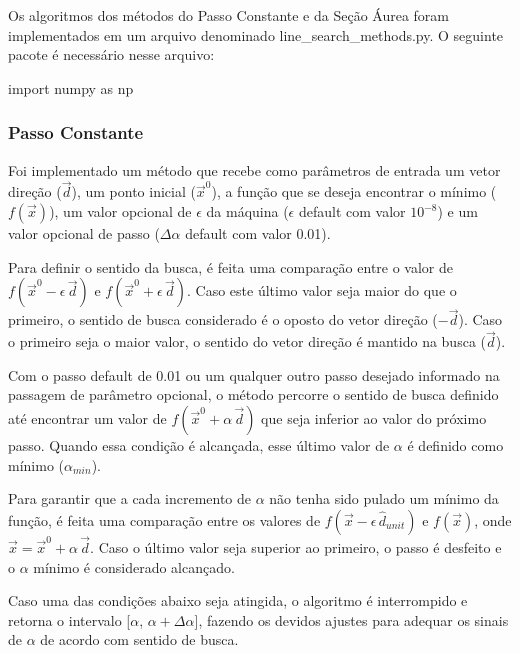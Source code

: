 \documentclass[10pt, a4paper]{article}
\begin{document}
Os algoritmos dos métodos do Passo Constante e da Seção Áurea foram implementados em um arquivo denominado line\_search\_methods.py.
O seguinte pacote é necessário nesse arquivo: 
\begin{python}
  import numpy as np
\end{python}

\subsubsection{Passo Constante}


Foi implementado um método que recebe como parâmetros de entrada um vetor direção ($\overrightarrow{d}$),
um ponto inicial ($\overrightarrow{x}^0$), 
a função que se deseja encontrar o mínimo ($f(\overrightarrow{x})$),
um valor opcional de $\epsilon$ da máquina ($\epsilon$ default com valor $10^{-8}$) e
um valor opcional de passo ($\Delta\alpha$ default com valor 0.01).

Para definir o sentido da busca, é feita uma comparação entre o valor de $f(\overrightarrow{x}^0-\epsilon\,\overrightarrow{d})$ e $f(\overrightarrow{x}^0+\epsilon\,\overrightarrow{d})$.
Caso este último valor seja maior do que o primeiro, o sentido de busca considerado é o oposto do vetor direção ($-\overrightarrow{d}$). Caso o primeiro seja
o maior valor, o sentido do vetor direção é mantido na busca ($\overrightarrow{d}$).

Com o passo default de 0.01 ou um qualquer outro passo desejado informado na passagem de parâmetro opcional,
o método percorre o sentido de busca definido até encontrar um valor de
$f(\overrightarrow{x}^0+ \alpha\,\overrightarrow{d})$ que seja inferior ao valor do próximo passo.
Quando essa condição é alcançada, esse último valor de $\alpha$ é definido como mínimo ($\alpha_{min}$). 

Para garantir que a cada incremento de $\alpha$ não tenha sido pulado um mínimo da função,
é feita uma comparação entre os valores de $f(\overrightarrow{x}-\epsilon\,\hat{d}_{unit})$ e $f(\overrightarrow{x})$, 
onde $\overrightarrow{x} = \overrightarrow{x}^0 + \alpha\,\overrightarrow{d}$.
Caso o último valor seja superior ao primeiro, o passo é desfeito e o $\alpha$ mínimo é considerado alcançado.

Caso uma das condições abaixo seja atingida, o algoritmo é interrompido e
retorna o intervalo [$\alpha$,  $\alpha + \Delta\alpha$],
fazendo os devidos ajustes para adequar os sinais de $\alpha$ de acordo com sentido de busca.
\end{document}
